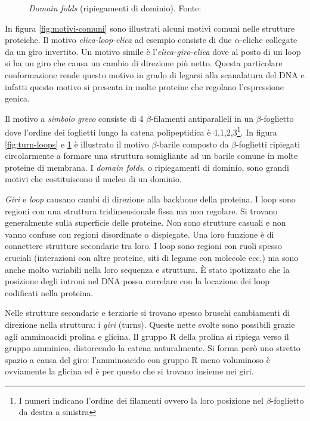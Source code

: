 {{\begin{figure}[!htb]
	\caption{\textit{Domain folds} (ripiegamenti di dominio). Fonte: \cite{moran2012principles}}
	\label{fig:domain-folds}
	\endminipage\hfill
	
\end{figure}

\par In figura \ref{fig:motivi-comuni} sono illustrati alcuni motivi comuni nelle strutture proteiche. 
Il motivo \textit{elica-loop-elica} ad esempio consiste di due $\alpha$-eliche collegate da un giro invertito. Un motivo simile è l'\textit{elica-giro-elica} dove al posto di un loop si ha un giro che causa un cambio di direzione più netto. Questa particolare conformazione rende questo motivo in grado di legarsi alla scanalatura del DNA e infatti questo motivo si presenta in molte proteine che regolano l'espressione genica.

\par Il motivo a \textit{simbolo greco} consiste di 4 $\beta$-filamenti antiparalleli in un $\beta$-foglietto dove l'ordine dei foglietti lungo la catena polipeptidica è 4,1,2,3\footnote{I numeri indicano l'ordine dei filamenti ovvero la loro posizione nel $\beta$-foglietto da destra a sinistra}. In figura \ref{fig:turn-loops} e \ref{fig:domain-folds} è illustrato il motivo $\beta$-barile composto da $\beta$-foglietti ripiegati circolarmente a formare una struttura somigliante ad un barile comune in molte proteine di membrana. I \textit{domain folds}, o ripiegamenti di dominio, sono grandi motivi che costituiscono il nucleo di un dominio.

\par \textit{Giri} e \textit{loop} causano cambi di direzione alla backbone della proteina. I loop sono regioni con una struttura tridimensionale fissa ma non regolare. Si trovano generalmente sulla superficie delle proteine. Non sono strutture casuali e non vanno confuse con regioni disordinate o dispiegate. Una loro funzione è di connettere strutture secondarie tra loro. I loop sono regioni con ruoli spesso cruciali (interazioni con altre proteine, siti di legame con molecole ecc.) ma sono anche molto variabili nella loro sequenza e struttura. È stato ipotizzato che la posizione degli introni nel DNA possa correlare con la locazione dei loop codificati nella proteina\supercite{PSPwiki}.

\par Nelle strutture secondarie e terziarie si trovano spesso bruschi cambiamenti di direzione nella struttura: i \textit{giri} (turns). Queste nette svolte sono possibili grazie agli amminoacidi prolina e glicina. Il gruppo R della prolina si ripiega verso il gruppo amminico, distorcendo la catena naturalmente. Si forma però uno stretto spazio a causa del giro: l'amminoacido con gruppo R meno voluminoso è ovviamente la glicina ed è per questo che si trovano insieme nei giri.

}}
